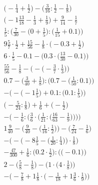 \documentclass[8pt]{article}
\begin{document}
\begin{align}
\big(-\frac{1}{4} + \frac{1}{2}\big) - \big(\frac{3}{16} : \frac{1}{2} - \frac{1}{8}\big) \\
\big(-1\frac{13}{18} - \frac{1}{3} + \frac{1}{9}\big) + \frac{9}{14} - \frac{1}{7} \\
\frac{1}{5} : \Big(\frac{7}{30} - \big(0 + \frac{1}{5}\big) : \big(\frac{1}{15} + 0.1\big)\Big) \\
9\frac{5}{7} \cdot \frac{1}{2} + \frac{15}{56} - \frac{1}{8} \cdot \big(-0.3 + \frac{1}{2}\big) \\
6 \cdot \frac{1}{5} - 0.1 - \Big(0.3 \cdot \big(\frac{13}{30} - 0.1\big)\Big) \\
\frac{55}{56} - \frac{1}{8} - \Big(-\big(-\frac{3}{7} \cdot \frac{1}{3}\big)\Big) \\
0.7 - \Big(\frac{3}{40} + \frac{1}{8}\Big) : \Big(0.7 - \big(\frac{1}{50} : 0.1\big)\Big) \\
-\Big(-\big(-1\frac{1}{5}\big) + 0.1 : \big(0.1 : \frac{1}{5}\big)\Big) \\
\big(-\frac{5}{24} : \frac{1}{8}\big) + \frac{1}{6} + \big(-\frac{1}{2}\big) \\
-\Bigg(-\frac{1}{6} : \bigg(\frac{3}{6} \cdot \Big(\frac{1}{21} : \big(\frac{16}{63} - \frac{1}{9}\big)\Big)\bigg)\Bigg) \\
1\frac{9}{40} - \Big(\frac{9}{40} - \big(\frac{1}{16} : \frac{1}{2}\big)\Big) - \Big(\frac{7}{24} - \frac{1}{6}\Big) \\
-\bigg(-\Big(-8\frac{1}{5} - \big(\frac{1}{20} : \frac{1}{4}\big)\Big) \cdot \frac{1}{8}\bigg) \\
-\frac{47}{300} + \frac{1}{6} : \Big(0.2 \cdot \frac{1}{2}\Big) : \Big(\big(-0.1\big)\Big) \\
2 - \Big(\frac{5}{8} - \frac{1}{8}\Big) - \Big(1 \cdot \big(4 \cdot \frac{1}{8}\big)\Big) \\
-\Big(-\frac{7}{8} + 1\frac{1}{8} \cdot \big(-\frac{1}{18} + 1\frac{3}{6} \cdot \frac{1}{9}\big)\Big)
\end{align}
\end{document}
